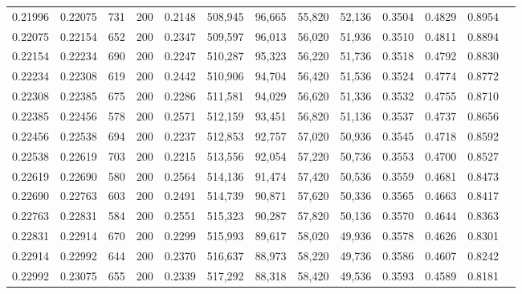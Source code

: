 \begin{tabular}{rrrrrrrrrrrrr}
0.21996 & 0.22075 &    731 & 200 &                                     0.2148 & 508,945 &  96,665 &  55,820 &  52,136 & 0.3504 & 0.4829 & 0.8954 \\
0.22075 & 0.22154 &    652 & 200 &                                     0.2347 & 509,597 &  96,013 &  56,020 &  51,936 & 0.3510 & 0.4811 & 0.8894 \\
0.22154 & 0.22234 &    690 & 200 &                                     0.2247 & 510,287 &  95,323 &  56,220 &  51,736 & 0.3518 & 0.4792 & 0.8830 \\
0.22234 & 0.22308 &    619 & 200 &                                     0.2442 & 510,906 &  94,704 &  56,420 &  51,536 & 0.3524 & 0.4774 & 0.8772 \\
0.22308 & 0.22385 &    675 & 200 &                                     0.2286 & 511,581 &  94,029 &  56,620 &  51,336 & 0.3532 & 0.4755 & 0.8710 \\
0.22385 & 0.22456 &    578 & 200 &                                     0.2571 & 512,159 &  93,451 &  56,820 &  51,136 & 0.3537 & 0.4737 & 0.8656 \\
0.22456 & 0.22538 &    694 & 200 &                                     0.2237 & 512,853 &  92,757 &  57,020 &  50,936 & 0.3545 & 0.4718 & 0.8592 \\
0.22538 & 0.22619 &    703 & 200 &                                     0.2215 & 513,556 &  92,054 &  57,220 &  50,736 & 0.3553 & 0.4700 & 0.8527 \\
0.22619 & 0.22690 &    580 & 200 &                                     0.2564 & 514,136 &  91,474 &  57,420 &  50,536 & 0.3559 & 0.4681 & 0.8473 \\
0.22690 & 0.22763 &    603 & 200 &                                     0.2491 & 514,739 &  90,871 &  57,620 &  50,336 & 0.3565 & 0.4663 & 0.8417 \\
0.22763 & 0.22831 &    584 & 200 &                                     0.2551 & 515,323 &  90,287 &  57,820 &  50,136 & 0.3570 & 0.4644 & 0.8363 \\
0.22831 & 0.22914 &    670 & 200 &                                     0.2299 & 515,993 &  89,617 &  58,020 &  49,936 & 0.3578 & 0.4626 & 0.8301 \\
0.22914 & 0.22992 &    644 & 200 &                                     0.2370 & 516,637 &  88,973 &  58,220 &  49,736 & 0.3586 & 0.4607 & 0.8242 \\
0.22992 & 0.23075 &    655 & 200 &                                     0.2339 & 517,292 &  88,318 &  58,420 &  49,536 & 0.3593 & 0.4589 & 0.8181 \\

\end{tabular}
